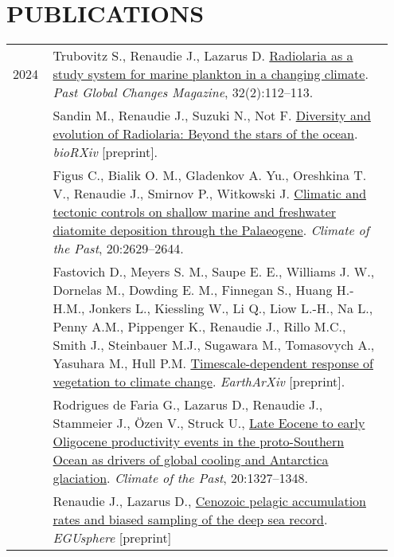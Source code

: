 \documentclass[11pt, a4paper]{article}
\begin{document}
\section{PUBLICATIONS}
\begin{longtable}{@{}p{0.1\linewidth} >{\small}P{0.85\linewidth}@{}}
2024
    & Trubovitz S., Renaudie J., Lazarus D. \href{https://doi.org/10.22498/pages.32.2.112}{Radiolaria as a study system for marine plankton in a changing climate}. \textit{Past Global Changes Magazine}, 32(2):112--113.\\
    & Sandin M., Renaudie J., Suzuki N., Not F. \href{https://www.biorxiv.org/content/10.1101/2024.10.02.614131v1}{Diversity and evolution of Radiolaria: Beyond the stars of the ocean}. \textit{bioRXiv} [preprint].\\
    & Figus C., Bialik O. M., Gladenkov A. Yu., Oreshkina T. V., Renaudie J., Smirnov P., Witkowski J. \href{https://doi.org/10.5194/cp-20-2629-2024}{Climatic and tectonic controls on shallow marine and freshwater diatomite deposition through the Palaeogene}. \textit{Climate of the Past}, 20:2629--2644.\\
    & Fastovich D., Meyers S. M., Saupe E. E., Williams J. W., Dornelas M., Dowding E. M., Finnegan S., Huang H.-H.M., Jonkers L., Kiessling W., Li Q., Liow L.-H., Na L., Penny A.M., Pippenger K., Renaudie J., Rillo M.C., Smith J., Steinbauer M.J., Sugawara M., Tomasovych A., Yasuhara M., Hull P.M. \href{https://doi.org/10.31223/X5S98P}{Timescale-dependent response of vegetation to climate change}. \textit{EarthArXiv} [preprint].\\
    & Rodrigues de Faria G., Lazarus D., Renaudie J., Stammeier J., Özen V., Struck U., \href{https://doi.org/10.5194/cp-20-1327-2024}{Late Eocene to early Oligocene productivity events in the proto-Southern Ocean as drivers of global cooling and Antarctica glaciation}. \textit{Climate of the Past}, 20:1327--1348.\\
    & Renaudie J., Lazarus D., \href{https://doi.org/10.5194/egusphere-2023-3087}{Cenozoic pelagic accumulation rates and biased sampling of the deep sea record}. \textit{EGUsphere} [preprint]\\

\end{longtable}
\end{document}
